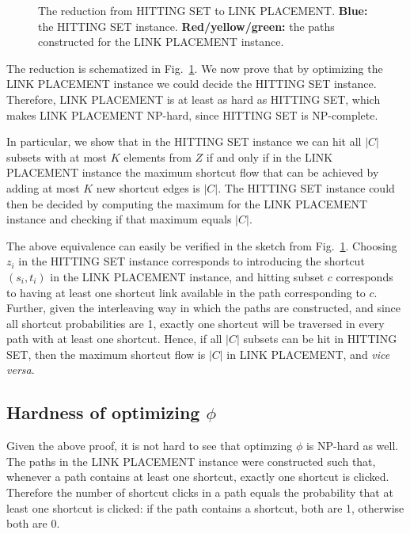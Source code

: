 \documentclass[11pt,letterpaper]{article}
\newcommand{\LP}{LINK PLACEMENT}
\newcommand{\HS}{HITTING SET}
\begin{document}
\begin{figure}

\caption{The reduction from \HS{} to \LP{}.
{\bf Blue:} the \HS{} instance.
{\bf Red/yellow/green:} the paths constructed for the \LP{} instance.
}
 \label{fig:reduction}
\end{figure}

The reduction is schematized in Fig.~\ref{fig:reduction}.
We now prove that by optimizing the \LP{} instance we could decide the \HS{} instance.
Therefore, \LP{} is at least as hard as \HS{}, which makes \LP{} NP-hard, since \HS{} is NP-complete.

In particular, we show that in the \HS{} instance we can hit all $|C|$ subsets with at most $K$ elements from $Z$ if and only if in the \LP{} instance the maximum shortcut flow that can be achieved by adding at most $K$ new shortcut edges is $|C|$.
The \HS{} instance could then be decided by computing the maximum for the \LP{} instance and checking if that maximum equals $|C|$.

The above equivalence can easily be verified in the sketch from Fig.~\ref{fig:reduction}.
Choosing $z_i$ in the \HS{} instance corresponds to introducing the shortcut $(s_i,t_i)$ in the \LP{} instance, and hitting subset $c$ corresponds to having at least one shortcut link available in the path corresponding to $c$.
Further, given the interleaving way in which the paths are constructed, and since all shortcut probabilities are 1, exactly one shortcut will be traversed in every path with at least one shortcut.
Hence, if all $|C|$ subsets can be hit in \HS{}, then the maximum shortcut flow is $|C|$ in \LP{}, and {\it vice versa}.


\subsection{Hardness of optimizing $\phi$}

Given the above proof, it is not hard to see that optimzing $\phi$ is NP-hard as well.
The paths in the \LP{} instance were constructed such that, whenever a path contains at least one shortcut, exactly one shortcut is clicked.
Therefore the number of shortcut clicks in a path equals the probability that at least one shortcut is clicked:
if the path contains a shortcut, both are 1, otherwise both are 0.
\end{document}
